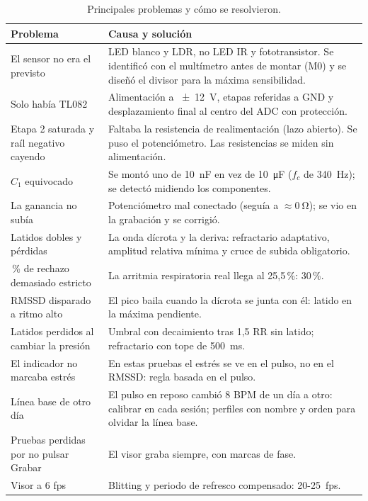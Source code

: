 \documentclass[11pt,a4paper]{article}
\begin{document}
\begin{table}[H]
\centering\small
\caption{Principales problemas y cómo se resolvieron.}
\label{tab:problemas}
\begin{tabularx}{\textwidth}{>{\raggedright\arraybackslash}p{4.4cm}X}
\toprule
Problema & Causa y solución \\
\midrule
El sensor no era el previsto & LED blanco y LDR, no LED IR y fototransistor. Se identificó con el multímetro antes de montar (M0) y se diseñó el divisor para la máxima sensibilidad. \\
Solo había TL082 & Alimentación a \qty{\pm 12}{V}, etapas referidas a GND y desplazamiento final al centro del ADC con protección. \\
Etapa 2 saturada y raíl negativo cayendo & Faltaba la resistencia de realimentación (lazo abierto). Se puso el potenciómetro. Las resistencias se miden sin alimentación. \\
$C_1$ equivocado & Se montó uno de \qty{10}{nF} en vez de \qty{10}{\micro\farad} ($f_c$ de \qty{340}{Hz}); se detectó midiendo los componentes. \\
La ganancia no subía & Potenciómetro mal conectado (seguía a $\approx \qty{0}{\ohm}$); se vio en la grabación y se corrigió. \\
Latidos dobles y pérdidas & La onda dícrota y la deriva: refractario adaptativo, amplitud relativa mínima y cruce de subida obligatorio. \\
20\,\% de rechazo demasiado estricto & La arritmia respiratoria real llega al 25,5\,\%: 30\,\%. \\
RMSSD disparado a ritmo alto & El pico baila cuando la dícrota se junta con él: latido en la máxima pendiente. \\
Latidos perdidos al cambiar la presión & Umbral con decaimiento tras 1,5 RR sin latido; refractario con tope de \qty{500}{ms}. \\
El indicador no marcaba estrés & En estas pruebas el estrés se ve en el pulso, no en el RMSSD: regla basada en el pulso. \\
Línea base de otro día & El pulso en reposo cambió 8 BPM de un día a otro: calibrar en cada sesión; perfiles con nombre y orden para olvidar la línea base. \\
Pruebas perdidas por no pulsar Grabar & El visor graba siempre, con marcas de fase. \\
Visor a 6 fps & Blitting y periodo de refresco compensado: 20-\qty{25}{fps}. \\
\bottomrule
\end{tabularx}
\end{table}
\end{document}
